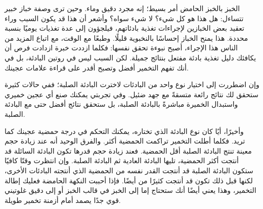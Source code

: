 الخبز بالخبز الحامض أمر بسيط؛ إنه مجرد دقيق وماء. وحين ترى وصفة خباز خبير تتساءل: هل هذا هو كل شيء؟ لا شيء سواه؟ وأشعر أن هذا قد يكون السبب وراء تعقيد بعض الخبازين لإجراءات تغذية بادئاتهم، فيلجؤون إلى عدة تغذيات يوميًا بنسبة محددة. هذا يمنح الخباز إحساسًا بالنخبوية قليلًا. وطبعًا مع الوقت، مع اتباع المزيد من الناس هذا الإجراء، أصبح نبوءة تحقق نفسها: فكلما ازددت خبرة ازدادت فرص أن يكافئك دليل تغذية بادئة مفتعل بنتائج جميلة. لكن السبب ليس في روتين البادئة، بل في أنك تفهم التخمير أفضل وتصبح أقدر على قراءة علامات عجينك.

وإن اضطررت إلى اختيار نوع واحد من البادئات لاخترت البادئة الصلبة؛ ففي حالات كثيرة ستحقق لك نتائج رائعة متسقةً مع جهد ضئيل. وفي تجربتي يمكنك صنع أي عجين خميري واستبدال الخميرة مباشرةً بالبادئة الصلبة، بل ستحقق نتائج أفضل حتى مع البادئة الصلبة.

وأخيرًا، أيًا كان نوع البادئة الذي تختاره، يمكنك التحكم في درجة حمضية عجينك كما تريد. فكلما أطلت التخمير تراكمت الحمضية أكثر. والفرق الوحيد أنه عند زيادة حجم معينة تنتج البادئة الصلبة أقل الحمضية. فعند زيادة حجم قدرها  تكون البادئة السائلة قد أنتجت أكثر الحمضية، تليها البادئة العادية ثم البادئة الصلبة. وإن انتظرت وقتًا كافيًا ستكون البادئة الصلبة قد أنتجت القدر نفسه من الحمضية الذي أنتجته البادئات الأخرى، لكنها قبل ذلك تكون قد أنتجت كثيرًا من  أيضًا. فإذا أحببت النكهة الحامضة فعليك إطالة التخمير، وهذا يعني أيضًا أنك ستحتاج إما إلى الخبز في قالب الخبز أو إلى دقيق غلوتيني قوي جدًا يصمد أمام أزمنة تخمير طويلة.
